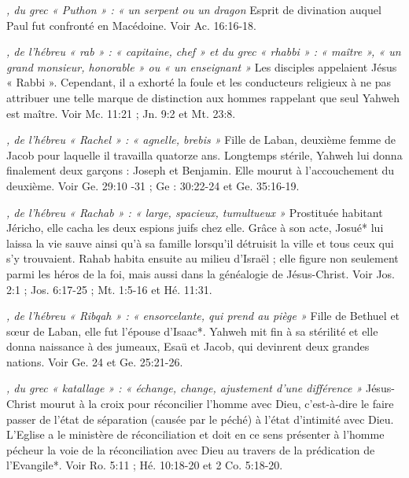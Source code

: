 \begin{multicols}{2}
{\textit{, du grec « Puthon » : « un serpent ou un dragon}\newline
Esprit de divination auquel Paul fut confronté en Macédoine. Voir Ac. 16:16-18.

\textit{, de l'hébreu « rab » : « capitaine, chef » et du grec « rhabbi » : « maître », « un grand monsieur, honorable » ou « un enseignant »}\newline
Les disciples appelaient Jésus « Rabbi ». Cependant, il a exhorté la foule et les conducteurs religieux à ne pas attribuer une telle marque de distinction aux hommes rappelant que seul Yahweh est maître. Voir Mc. 11:21 ; Jn. 9:2 et Mt. 23:8.

\textit{, de l'hébreu « Rachel » : « agnelle, brebis »}\newline
Fille de Laban, deuxième femme de Jacob pour laquelle il travailla quatorze ans. Longtemps stérile, Yahweh lui donna finalement deux garçons : Joseph et Benjamin. Elle mourut à l'accouchement du deuxième. Voir Ge. 29:10 -31 ; Ge : 30:22-24 et Ge. 35:16-19.

\textit{, de l'hébreu « Rachab » : « large, spacieux, tumultueux »}\newline
Prostituée habitant Jéricho, elle cacha les deux espions juifs chez elle. Grâce à son acte, Josué* lui laissa la vie sauve ainsi qu'à sa famille lorsqu'il détruisit la ville et tous ceux qui s'y trouvaient. Rahab habita ensuite au milieu d'Israël ; elle figure non seulement parmi les héros de la foi, mais aussi dans la généalogie de Jésus-Christ. Voir Jos. 2:1 ; Jos. 6:17-25 ; Mt. 1:5-16 et Hé. 11:31.

\textit{, de l'hébreu « Ribqah » : « ensorcelante, qui prend au piège »}\newline
Fille de Bethuel et sœur de Laban, elle fut l'épouse d'Isaac*. Yahweh mit fin à sa stérilité et elle donna naissance à des jumeaux, Esaü et Jacob, qui devinrent deux grandes nations. Voir Ge. 24 et Ge. 25:21-26.

\textit{, du grec « katallage » : « échange, change, ajustement d'une différence »}\newline
Jésus-Christ mourut à la croix pour réconcilier l'homme avec Dieu, c'est-à-dire le faire passer de l'état de séparation (causée par le péché) à l'état d'intimité avec Dieu. L'Eglise a le ministère de réconciliation et doit en ce sens présenter à l'homme pécheur la voie de la réconciliation avec Dieu au travers de la prédication de l'Evangile*. Voir Ro. 5:11 ; Hé. 10:18-20 et 2 Co. 5:18-20.

}
\end{multicols}
